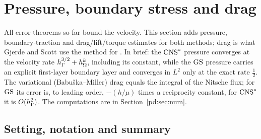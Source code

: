 \section{Pressure, boundary stress and drag}\label{pd:sec}

All error theorems so far bound the velocity. This section adds pressure, boundary-traction and drag/lift/torque estimates for both methods; drag is what Gjerde and Scott use the method for \cite{GjerdeScott2024}. In brief: the $\mathrm{CNS}^\ast$ pressure converges at the velocity rate $h_\Gamma^{3/2}+h_\Omega^k$, including its constant, while the $\mathrm{GS}$ pressure carries an explicit first-layer boundary layer and converges in $L^2$ only at the exact rate $\frac12$. The variational (Babu\v{s}ka--Miller) drag equals the integral of the Nitsche flux; for $\mathrm{GS}$ its error is, to leading order, $-(h/\mu)$ times a reciprocity constant, for $\mathrm{CNS}^\ast$ it is $O(h_\Gamma^2)$. The computations are in Section~\ref{pd:sec:num}.

\subsection{Setting, notation and summary}\label{pd:sec:setting}


